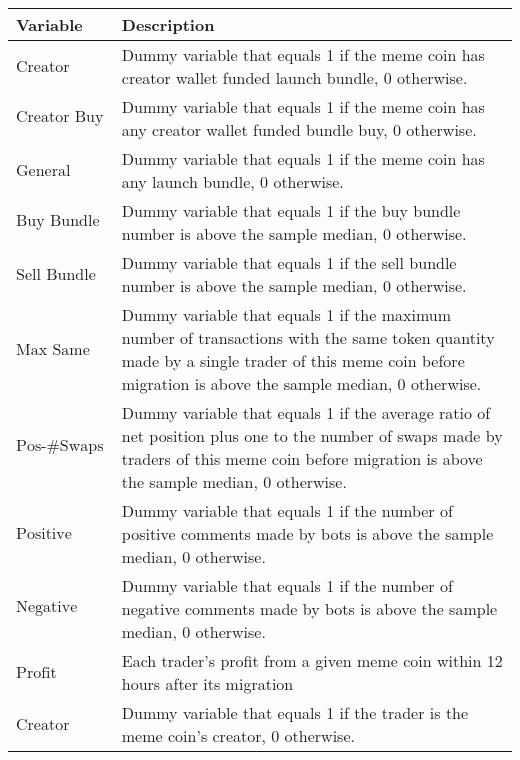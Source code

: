 \begin{tabularx}{\textwidth}{lX}\hline
Variable & Description \\
\hline
$\text{Creator Launch Bundle}$ & Dummy variable that equals 1 if the meme coin has creator wallet funded launch bundle, 0 otherwise. \\
$\text{Creator Buy Bundle}$ & Dummy variable that equals 1 if the meme coin has any creator wallet funded bundle buy, 0 otherwise. \\
$\text{General Launch Bundle}$ & Dummy variable that equals 1 if the meme coin has any launch bundle, 0 otherwise. \\
$\text{Buy Bundle}$ & Dummy variable that equals 1 if the buy bundle number is above the sample median, 0 otherwise. \\
$\text{Sell Bundle}$ & Dummy variable that equals 1 if the sell bundle number is above the sample median, 0 otherwise. \\
$\text{Max Same Txn}$ & Dummy variable that equals 1 if the maximum number of transactions with the same token quantity made by a single trader of this meme coin before migration is above the sample median, 0 otherwise. \\
$\text{Pos-\#Swaps Ratio}$ & Dummy variable that equals 1 if the average ratio of net position plus one to the number of swaps made by traders of this meme coin before migration is above the sample median, 0 otherwise. \\
$\text{Positive Comment Bot}$ & Dummy variable that equals 1 if the number of positive comments made by bots is above the sample median, 0 otherwise. \\
$\text{Negative Comment Bot}$ & Dummy variable that equals 1 if the number of negative comments made by bots is above the sample median, 0 otherwise. \\
$\text{Profit}$ & Each trader's profit from a given meme coin within 12 hours after its migration \\
$\text{Creator}$ & Dummy variable that equals 1 if the trader is the meme coin's creator, 0 otherwise. \\
\hline
\end{tabularx}
